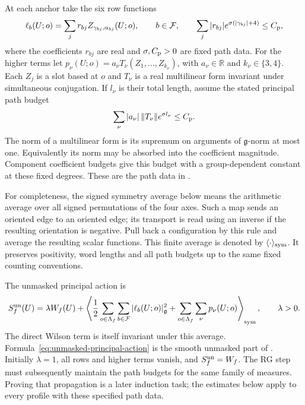 \documentclass[11pt,reqno]{amsart}
\numberwithin{equation}{section}
\theoremstyle{definition}
\theoremstyle{remark}
\newcommand{\R}{\mathbb R}
\newcommand{\g}{\mathfrak g}
\begin{document}
At each anchor take the six row functions
\begin{equation}
       \ell_b(U;o)=\sum_j r_{bj}
                          Z_{\gamma_{bj},\alpha_{bj}}(U;o),
       \qquad b\in\mathcal F,
       \qquad
       \sum_j|r_{bj}|e^{\sigma(|\gamma_{bj}|+4)}\le C_{\rm p},
 \label{eq:stationary-row-budget}
\end{equation}
where the coefficients \(r_{bj}\) are real and
\(\sigma,C_{\rm p}>0\) are fixed path data.
For the higher terms let
\(p_\nu(U;o)=a_\nu T_\nu(Z_1,\ldots,Z_{k_\nu})\), with
\(a_\nu\in\R\) and \(k_\nu\in\{3,4\}\).
Each \(Z_j\) is a slot based at \(o\)
and \(T_\nu\) is a real multilinear form invariant under
simultaneous conjugation. If \(l_\nu\) is their total length,
assume the stated principal path budget
\begin{equation}
                   \sum_\nu |a_\nu|\,\|T_\nu\|e^{\sigma l_\nu}
                                                         \le C_{\rm p}.
 \label{eq:stationary-higher-budget}
\end{equation}
The norm of a multilinear form is its supremum on arguments of
\(\g\)-norm at most one. Equivalently its norm may be absorbed
into the coefficient magnitude. Component coefficient budgets
give this budget with a group-dependent constant at these fixed
degrees. These are the path data in
\cite[(13.15)--(13.16), p.~50]{Main}.

For completeness, the signed symmetry average below means the
arithmetic average over all signed permutations of the four axes.
Such a map sends an oriented edge to an oriented edge; its
transport is read using an inverse if the resulting orientation
is negative. Pull back a configuration by this rule and average
the resulting scalar functions. This finite average is denoted
by \(\langle\cdot\rangle_{\rm sym}\).
It preserves positivity, word lengths and all path budgets up
to the same fixed counting conventions.

The unmasked principal action is
\begin{equation}
 S_f^{\rm un}(U)=\lambda W_f(U)
       +\left\langle\frac12\sum_{o\in\Lambda_f}\sum_{b\in\mathcal F}
                                      |\ell_b(U;o)|_{\g}^2
                    +\sum_{o\in\Lambda_f}\sum_\nu p_\nu(U;o)
         \right\rangle_{\rm sym},\qquad \lambda>0.
 \label{eq:unmasked-principal-action}
\end{equation}
The direct Wilson term is itself invariant under this average.
Formula~\eqref{eq:unmasked-principal-action} is the smooth
unmasked part of \cite[(13.18), p.~51]{Main}.
Initially \(\lambda=1\), all rows and higher terms vanish,
and \(S_f^{\rm un}=W_f\). The RG step must subsequently maintain
the path budgets for the same family of measures. Proving that
propagation is a later induction task; the estimates below apply
to every profile with these specified path data.
\end{document}
